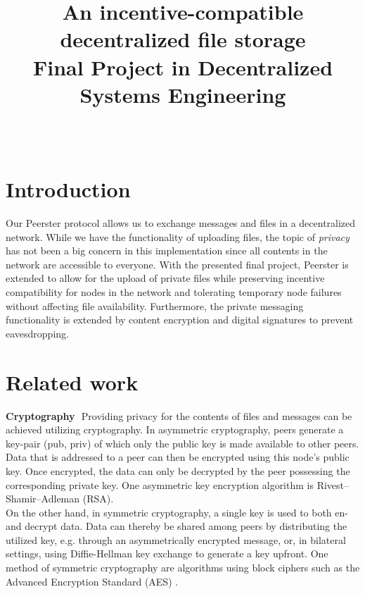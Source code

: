 \documentclass{article}
\title{
\vspace{-10mm}\fontsize{19pt}{10pt}\selectfont
\textbf{An incentive-compatible decentralized file storage}\\
\vspace{0.5em}\fontsize{12pt}{10pt}\selectfont
\textbf{Final Project in Decentralized Systems Engineering}\\
\vspace{0.7em}\fontsize{12pt}{10pt}\selectfont
\text{Carolin Beer, SCIPER Nr. 294852}\\
\vspace{-4ex}
}
\author{}
\date{}
\begin{document}

\maketitle %
\thispagestyle{fancy} %
\newcommand{\elem}[1]{\noindent\textbf{#1}\,\,}
\section*{Introduction}
Our Peerster protocol allows us to exchange messages and files in a decentralized network. While we have the functionality of uploading files, the topic of \emph{privacy} has not been a big concern in this implementation since all contents in the network are accessible to everyone.
With the presented final project, Peerster is  extended to allow for the upload of private files while preserving incentive compatibility for nodes in the network and tolerating temporary node failures without affecting file availability. Furthermore, the private messaging functionality is extended by content encryption and digital signatures to prevent eavesdropping.

\section*{Related work}
\elem{Cryptography}
Providing privacy for the contents of files and messages can be achieved utilizing cryptography. In asymmetric cryptography, peers generate a key-pair (pub, priv) of which only the public key is made available to other peers. Data that is addressed to a peer can then be encrypted using this node's public key. Once encrypted, the data can only be decrypted by the peer possessing the corresponding private key. One asymmetric key encryption algorithm is Rivest–Shamir–Adleman (RSA).\\
On the other hand, in symmetric cryptography, a single key is used to both en- and decrypt data. Data can thereby be shared among peers by distributing the utilized key, e.g. through an asymmetrically encrypted message, or, in bilateral settings, using Diffie-Hellman key exchange to generate a key upfront. One method of symmetric cryptography are algorithms using block ciphers such as the Advanced Encryption Standard (AES) \citep{Smart.2002}.
\\\vspace{0.5em}
\end{document}
